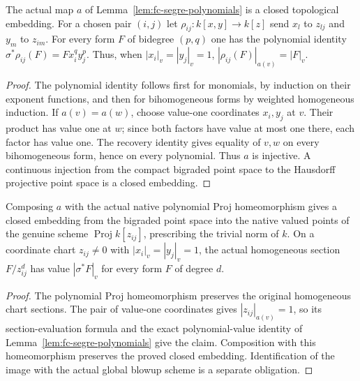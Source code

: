 \begin{lemma}\label{lem:fc-segre-embedding}
\leanok
{}
The actual map $a$ of Lemma~\ref{lem:fc-segre-polynomials} is a closed topological embedding.
For a chosen pair $(i,j)$ let $\rho_{ij}\colon k[x,y]\to k[z]$ send $x_l$ to $z_{lj}$ and $y_m$ to $z_{im}$.
For every form $F$ of bidegree $(p,q)$ one has the polynomial identity
$\sigma^*\rho_{ij}(F)=F x_i^q y_j^p$. Thus, when $|x_i|_v=|y_j|_v=1$,
$|\rho_{ij}(F)|_{a(v)}=|F|_v$.
\end{lemma}

\begin{proof}
The polynomial identity follows first for monomials, by induction on their exponent functions, and then for
bihomogeneous forms by weighted homogeneous induction. If $a(v)=a(w)$, choose value-one coordinates $x_i,y_j$
at $v$. Their product has value one at $w$; since both factors have value at most one there, each factor has
value one. The recovery identity gives equality of $v,w$ on every bihomogeneous form, hence on every polynomial.
Thus $a$ is injective. A continuous injection from the compact bigraded point space to the Hausdorff projective
point space is a closed embedding.
\end{proof}

\begin{lemma}\label{lem:fc-segre-native}
\leanok
{}
Composing $a$ with the actual native polynomial Proj homeomorphism gives a closed embedding from the bigraded
point space into the native valued points of the genuine scheme $\operatorname{Proj}k[z_{ij}]$, prescribing the
trivial norm of $k$. On a coordinate chart $z_{ij}\ne0$ with $|x_i|_v=|y_j|_v=1$, the actual homogeneous section
$F/z_{ij}^d$ has value $|\sigma^*F|_v$ for every form $F$ of degree $d$.
\end{lemma}

\begin{proof}
The polynomial Proj homeomorphism preserves the original homogeneous chart sections. The pair of value-one
coordinates gives $|z_{ij}|_{a(v)}=1$, so its section-evaluation formula and the exact polynomial-value identity
of Lemma~\ref{lem:fc-segre-polynomials} give the claim. Composition with this homeomorphism preserves the proved
closed embedding. Identification of the image with the actual global blowup scheme is a separate obligation.
\end{proof}

